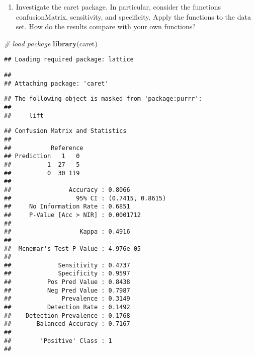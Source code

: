 \documentclass[
]{article}
\newenvironment{Shaded}{\begin{snugshade}}{\end{snugshade}}
\newcommand{\AttributeTok}[1]{\textcolor[rgb]{0.13,0.29,0.53}{#1}}
\newcommand{\CommentTok}[1]{\textcolor[rgb]{0.56,0.35,0.01}{\textit{#1}}}
\newcommand{\FunctionTok}[1]{\textcolor[rgb]{0.13,0.29,0.53}{\textbf{#1}}}
\newcommand{\NormalTok}[1]{#1}
\newcommand{\OtherTok}[1]{\textcolor[rgb]{0.56,0.35,0.01}{#1}}
\newcommand{\SpecialCharTok}[1]{\textcolor[rgb]{0.81,0.36,0.00}{\textbf{#1}}}
\newcommand{\StringTok}[1]{\textcolor[rgb]{0.31,0.60,0.02}{#1}}
\providecommand{\tightlist}{%
  \setlength{\itemsep}{0pt}\setlength{\parskip}{0pt}}
\begin{document}
\begin{enumerate}
\def\labelenumi{\arabic{enumi}.}
\setcounter{enumi}{11}
\tightlist
\item
  Investigate the caret package. In particular, consider the functions
  confusionMatrix, sensitivity, and specificity. Apply the functions to
  the data set. How do the results compare with your own functions?
\end{enumerate}

\begin{Shaded}
\begin{Highlighting}[]
\CommentTok{\# load package}
\FunctionTok{library}\NormalTok{(caret)}
\end{Highlighting}
\end{Shaded}

\begin{verbatim}
## Loading required package: lattice
\end{verbatim}

\begin{verbatim}
## 
## Attaching package: 'caret'
\end{verbatim}

\begin{verbatim}
## The following object is masked from 'package:purrr':
## 
##     lift
\end{verbatim}

\begin{Shaded}
\end{Shaded}

\begin{verbatim}
## Confusion Matrix and Statistics
## 
##           Reference
## Prediction   1   0
##          1  27   5
##          0  30 119
##                                           
##                Accuracy : 0.8066          
##                  95% CI : (0.7415, 0.8615)
##     No Information Rate : 0.6851          
##     P-Value [Acc > NIR] : 0.0001712       
##                                           
##                   Kappa : 0.4916          
##                                           
##  Mcnemar's Test P-Value : 4.976e-05       
##                                           
##             Sensitivity : 0.4737          
##             Specificity : 0.9597          
##          Pos Pred Value : 0.8438          
##          Neg Pred Value : 0.7987          
##              Prevalence : 0.3149          
##          Detection Rate : 0.1492          
##    Detection Prevalence : 0.1768          
##       Balanced Accuracy : 0.7167          
##                                           
##        'Positive' Class : 1               
## 
\end{verbatim}
\end{document}
